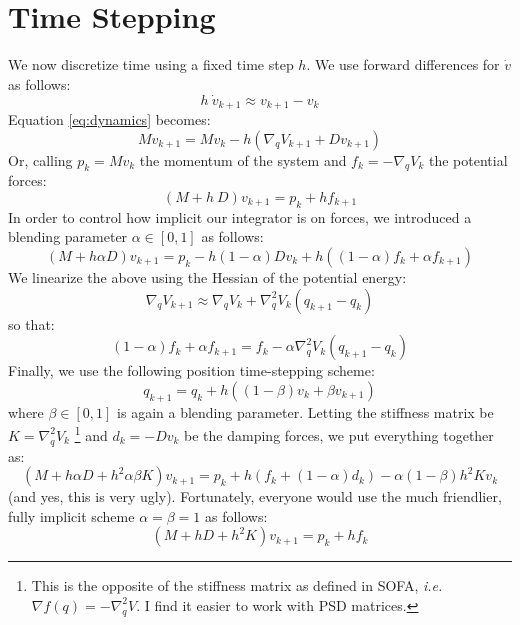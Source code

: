 \documentclass{article}
\newcommand{\block}[1]{\left(#1\right)}
\begin{document}
\section{Time Stepping}
%
We now discretize time using a fixed time step $h$. We use forward
differences for $\dot{v}$ as follows:
%
\begin{equation}
  h\ \dot{v}_{k+1} \approx v_{k+1} - v_k
\end{equation}
%
Equation \eqref{eq:dynamics} becomes: 
%
\begin{equation}
  M v_{k+1} = M v_k - h \block{\nabla_q V_{k+1} + D v_{k+1}}
\end{equation}
%
Or, calling $p_k = M v_k$ the momentum of the system and $f_k =
-\nabla_q V_k$ the potential forces:
%
\begin{equation}
  \block{M + h\ D} v_{k+1} = p_k + h f_{k+1}
\end{equation}
%
In order to control how implicit our integrator is on forces, we
introduced a blending parameter $\alpha \in [0, 1]$ as follows:
%
\begin{equation}
  \block{M + h \alpha D} v_{k+1} = p_k - h(1 - \alpha) D v_k + h \block{(1 - \alpha) f_k + \alpha f_{k+1}}
\end{equation}
%
We linearize the above using the Hessian of the potential energy:
%
\begin{equation}
\nabla_q V_{k+1} \approx \nabla_q V_k + \nabla_q^2 V_k \block{q_{k+1} - q_k}
\end{equation}
%
so that:
%
\begin{equation}
  (1 - \alpha) f_k + \alpha f_{k+1} = f_k - \alpha \nabla_q^2 V_k \block{q_{k+1} - q_k}
\end{equation}
%
Finally, we use the following position time-stepping scheme:
%
\begin{equation}
  q_{k+1} = q_k + h \block{ (1-\beta) v_k + \beta v_{k+1}}
\end{equation}
%
where $\beta \in [0, 1]$ is again a blending parameter.
%
Letting the stiffness matrix be $K = \nabla_q^2 V_k$ %
\footnote{
%
  This is the opposite of the stiffness matrix as defined in SOFA,
  \emph{i.e.} $\nabla f(q) = -\nabla_q^2 V$. I find it easier to work with
  PSD matrices.} and $d_k = -D v_k$ be the damping forces, we put
everything together as:
%
\begin{equation}
  \label{eq:time-stepping}
  \block{M + h\alpha D + h^2 \alpha \beta K} v_{k+1} = 
  p_k + h \block{ f_k + (1 - \alpha) d_k} - \alpha ( 1 - \beta) h^2 K v_k 
\end{equation}
%
(and yes, this is very ugly). Fortunately, everyone would use the much
friendlier, fully implicit scheme $\alpha = \beta = 1$ as follows:
%
\begin{equation}
   \block{M + hD + h^2K} v_{k+1} = p_k + h f_k
\end{equation}
%
\end{document}
